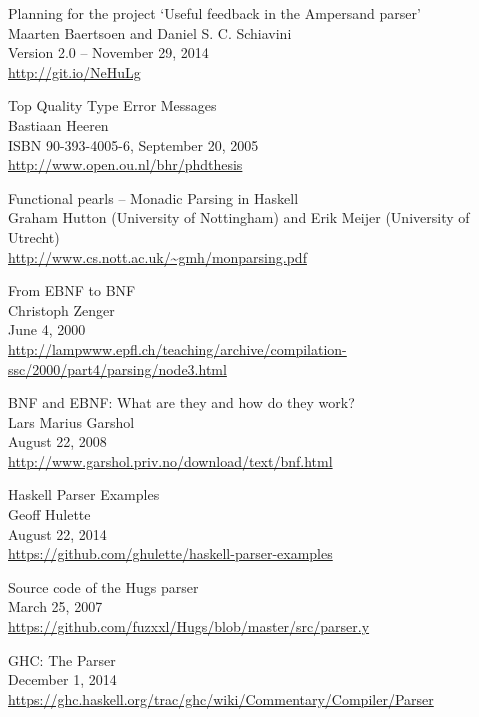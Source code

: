 \label{sec:bibliography}

\begin{thebibliography}{99}

	Planning for the project `Useful feedback in the Ampersand parser'\\
	Maarten Baertsoen and Daniel S. C. Schiavini\\
	Version 2.0 -- November 29, 2014\\
	\url{http://git.io/NeHuLg}

	Top Quality Type Error Messages\\
	Bastiaan Heeren\\
	ISBN 90-393-4005-6, September 20, 2005\\
	\url{http://www.open.ou.nl/bhr/phdthesis}

	Functional pearls -- Monadic Parsing in Haskell\\
	Graham Hutton (University of Nottingham) and Erik Meijer (University of Utrecht)\\
	\url{http://www.cs.nott.ac.uk/~gmh/monparsing.pdf}

	 From EBNF to BNF \\
	 Christoph Zenger\\
	 June 4, 2000\\
	 \url{http://lampwww.epfl.ch/teaching/archive/compilation-ssc/2000/part4/parsing/node3.html}

	BNF and EBNF: What are they and how do they work?\\
	Lars Marius Garshol\\
	August 22, 2008\\
	\url{http://www.garshol.priv.no/download/text/bnf.html}

	Haskell Parser Examples\\
	Geoff Hulette\\
	August 22, 2014\\
	\url{https://github.com/ghulette/haskell-parser-examples}

	Source code of the Hugs parser\\
	March 25, 2007\\
	\url{https://github.com/fuzxxl/Hugs/blob/master/src/parser.y}

	GHC: The Parser\\
	December 1, 2014\\
	\url{https://ghc.haskell.org/trac/ghc/wiki/Commentary/Compiler/Parser}


\end{thebibliography}
